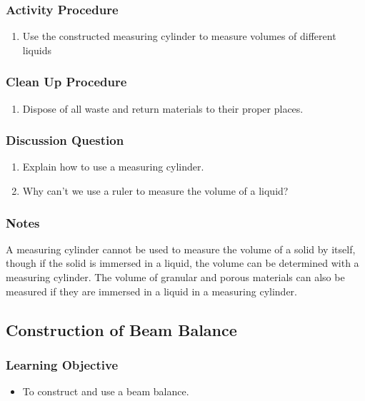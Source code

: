 \subsubsection*{Activity Procedure}
\begin{enumerate}
\item{Use the constructed measuring cylinder to measure volumes of different liquids}
\end{enumerate}

\subsubsection*{Clean Up Procedure}
\begin{enumerate}
\item{Dispose of all waste and return materials to their proper places.}
\end{enumerate}

\subsubsection*{Discussion Question}
\begin{enumerate}
\item{Explain how to use a measuring cylinder.}
\item{Why can't we use a ruler to measure the volume of a liquid?}
\end{enumerate}

\subsubsection*{Notes}
A measuring cylinder cannot be used to measure the volume of a solid by itself, though if the solid is immersed in a liquid, the volume can be determined with a measuring cylinder.  The volume of granular and porous materials can also be measured if they are immersed in a liquid in a measuring cylinder.

\subsection{Construction of Beam Balance}

\subsubsection*{Learning Objective}
\begin{itemize}
\item{To construct and use a beam balance.} 
\end{itemize}

